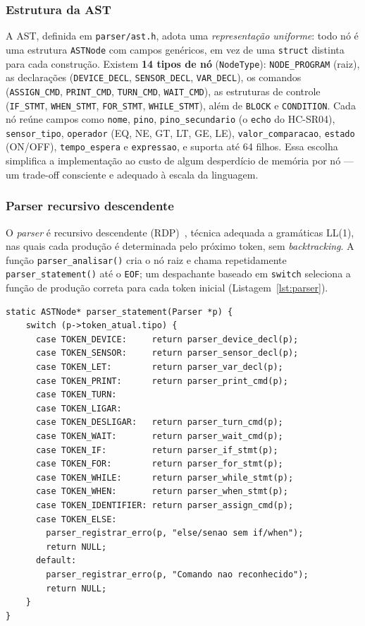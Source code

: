 \documentclass[conference]{IEEEtran}
\begin{document}
\subsubsection{Estrutura da AST}
A AST, definida em \texttt{parser/ast.h}, adota uma \emph{representação
uniforme}: todo nó é uma estrutura \texttt{ASTNode} com campos genéricos,
em vez de uma \texttt{struct} distinta para cada construção. Existem
\textbf{14 tipos de nó} (\texttt{NodeType}): \texttt{NODE\_PROGRAM} (raiz),
as declarações (\texttt{DEVICE\_DECL}, \texttt{SENSOR\_DECL},
\texttt{VAR\_DECL}), os comandos (\texttt{ASSIGN\_CMD}, \texttt{PRINT\_CMD},
\texttt{TURN\_CMD}, \texttt{WAIT\_CMD}), as estruturas de controle
(\texttt{IF\_STMT}, \texttt{WHEN\_STMT}, \texttt{FOR\_STMT},
\texttt{WHILE\_STMT}), além de \texttt{BLOCK} e \texttt{CONDITION}. Cada nó
reúne campos como \texttt{nome}, \texttt{pino}, \texttt{pino\_secundario}
(o \texttt{echo} do HC-SR04), \texttt{sensor\_tipo}, \texttt{operador}
(EQ, NE, GT, LT, GE, LE), \texttt{valor\_comparacao}, \texttt{estado}
(ON/OFF), \texttt{tempo\_espera} e \texttt{expressao}, e suporta até 64
filhos. Essa escolha simplifica a implementação ao custo de algum
desperdício de memória por nó --- um trade-off consciente e adequado à
escala da linguagem.

\subsubsection{Parser recursivo descendente}
O \emph{parser} é recursivo descendente (RDP)~\cite{aho2006,wirth1976},
técnica adequada a gramáticas LL(1), nas quais cada produção é determinada
pelo próximo token, sem \emph{backtracking}. A função
\texttt{parser\_analisar()} cria o nó raiz e chama repetidamente
\texttt{parser\_statement()} até o \texttt{EOF}; um despachante baseado em
\texttt{switch} seleciona a função de produção correta para cada token
inicial (Listagem~\ref{lst:parser}).

\begin{lstlisting}[style=csmall,caption={Despachante de comandos do parser.},label={lst:parser}]
static ASTNode* parser_statement(Parser *p) {
    switch (p->token_atual.tipo) {
      case TOKEN_DEVICE:     return parser_device_decl(p);
      case TOKEN_SENSOR:     return parser_sensor_decl(p);
      case TOKEN_LET:        return parser_var_decl(p);
      case TOKEN_PRINT:      return parser_print_cmd(p);
      case TOKEN_TURN:
      case TOKEN_LIGAR:
      case TOKEN_DESLIGAR:   return parser_turn_cmd(p);
      case TOKEN_WAIT:       return parser_wait_cmd(p);
      case TOKEN_IF:         return parser_if_stmt(p);
      case TOKEN_FOR:        return parser_for_stmt(p);
      case TOKEN_WHILE:      return parser_while_stmt(p);
      case TOKEN_WHEN:       return parser_when_stmt(p);
      case TOKEN_IDENTIFIER: return parser_assign_cmd(p);
      case TOKEN_ELSE:
        parser_registrar_erro(p, "else/senao sem if/when");
        return NULL;
      default:
        parser_registrar_erro(p, "Comando nao reconhecido");
        return NULL;
    }
}
\end{lstlisting}
\end{document}
